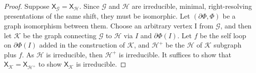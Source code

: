 \documentclass{article}
\newcommand{\Gc}{\mathcal{G}}  %
\newcommand{\Hc}{\mathcal{H}}  %
\newcommand{\Bc}{\mathcal{B}}
\newcommand{\Kc}{\mathcal{K}}
\newcommand{\shift}[1]{\mathsf{X}_{#1}}
\theoremstyle{definition}
\begin{document}
    \begin{proof}
        Suppose \(\shift{\Gc} = \shift{\Hc}\). Since \(\Gc\) and \(\Hc\) are irreducible,
        minimal, right-resolving presentations of the same shift, they must be 
        isomorphic. Let \((\partial\Phi, \Phi)\) be a graph isomorphism between them. 
        Choose an arbitrary vertex I from \(\Gc\), and then let \(\Kc\) 
        be the graph connecting \(\Gc\) to \(\Hc\) via \(I\) and \(\partial\Phi(I)\).
        Let \(f\) be the self loop on \(\partial\Phi(I)\) added in the construction of
        \(\Kc\), and \(\Hc^+\) be the \(\Hc\) of \(\Kc\) subgraph plus \(f\).
         As 
        \(\Hc\) is irreducible, then \(\Hc^+\) is irreducible. 
        It suffices to show that \(\shift{\Kc} = \shift{\Hc^+}\) to show \(\shift{\Kc}\) 
        is irreducible. 




\end{proof}
\end{document}
